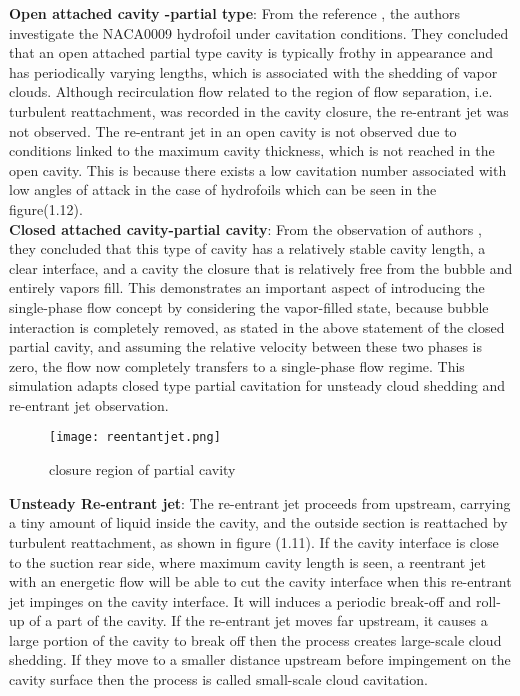 \textbf{Open attached cavity -partial type}:   From the reference \cite{ceccio2001}, 
the authors investigate the NACA0009 hydrofoil under cavitation conditions. 
They concluded that an open attached partial type cavity is typically frothy in
appearance and has periodically varying lengths, which is associated
with the shedding of vapor clouds. Although recirculation flow related to the region 
of flow separation, i.e. turbulent reattachment, was recorded in the cavity closure, the re-entrant jet was not observed.
The re-entrant jet in an open cavity is not observed due to conditions linked to the 
maximum cavity thickness, which is not reached in the open cavity. This is because there exists 
a low cavitation number associated with low angles of
attack in the case of hydrofoils which can be seen in the
figure(1.12).\\ 
\textbf{Closed attached cavity-partial cavity}: From the observation of 
authors \cite{ceccio2001}, they concluded that this type of cavity has a
relatively stable cavity length, a clear interface, and a cavity
the closure that is relatively free from the bubble and  entirely vapors
fill. This demonstrates an important aspect of introducing the single-phase flow
concept by considering the vapor-filled state, because bubble interaction is completely
removed, as stated in the above statement of the closed partial cavity, and assuming
the relative velocity between these two phases is zero, the flow now completely transfers
to a single-phase flow regime. This simulation adapts closed type partial cavitation 
for unsteady cloud shedding and re-entrant jet observation. \\

\begin{figure}[H]
  \centering
  \texttt{[image: reentantjet.png]}
  \caption{closure region of partial cavity \cite{FundamentalsofCavitation.2004}}
  \label{fig:fig11}
\end{figure}

\textbf{Unsteady Re-entrant jet}: The re-entrant jet proceeds from upstream, carrying a tiny amount of liquid inside 
the cavity, and the outside section is reattached by turbulent reattachment, as shown in figure (1.11). 
If the cavity interface is close to the suction rear side, where maximum cavity length is seen, 
a reentrant jet with an energetic flow will be able to cut the cavity interface when this 
re-entrant jet impinges on the cavity interface. It will induces a periodic break-off 
and roll-up of a part of the cavity. If the
re-entrant jet moves far upstream, it causes a large portion of the
cavity to break off then the process creates large-scale cloud shedding. If
they move to a smaller distance upstream before impingement on the
cavity surface then the process is called small-scale cloud
cavitation.

